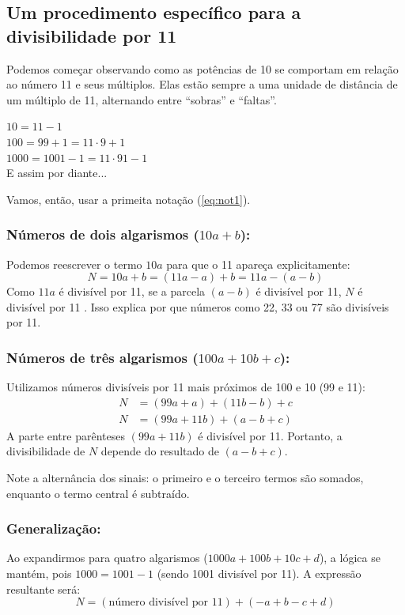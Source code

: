 \documentclass[12pt,a4paper]{article}
\begin{document}
		\newpage
		
		\subsection{Um procedimento específico para a divisibilidade por 11}
		\label{sub:div_11}
		
		Podemos começar observando como as potências de 10 se comportam em relação ao número 11 e seus múltiplos. Elas estão sempre a uma unidade de distância de um múltiplo de 11, alternando entre ``sobras'' e ``faltas''. 
		
		$10 = 11-1$\\
		$100 = 99 +1 = 11 \cdot 9 + 1$\\
		$1000 = 1001 - 1 = 11 \cdot 91 -1 $\\
		E assim por diante...
		
		Vamos, então, usar a primeita notação (\ref{eq:not1}).
		
		\subsubsection{Números de dois algarismos ($10a + b$):}
		Podemos reescrever o termo $10a$ para que o 11 apareça explicitamente:
		\[ N = 10a + b = (11a - a) + b = 11a - (a - b) \]
		Como $11a$ é divisível por 11, se a parcela $(a - b)$ é divisível por 11, $N$ é divisível por 11 . Isso explica por que números como 22, 33 ou 77 são divisíveis por 11.
		
		\subsubsection{Números de três algarismos ($100a + 10b + c$):}
		Utilizamos números divisíveis por 11 mais próximos de 100 e 10 (99 e 11):
		\begin{align*}
			N &= (99a + a) + (11b - b) + c \\
			N &= (99a + 11b) + (a - b + c)
		\end{align*}
		A parte entre parênteses $(99a + 11b)$ é divisível por 11. Portanto, a divisibilidade de $N$ depende do resultado de $(a - b + c)$. 
		
		Note a alternância dos sinais: o primeiro e o terceiro termos são somados, enquanto o termo central é subtraído.
		
		\subsubsection{Generalização:}
		Ao expandirmos para quatro algarismos ($1000a + 100b + 10c + d$), a lógica se mantém, pois $1000 = 1001 - 1$ (sendo 1001 divisível por 11). A expressão resultante será:
		\[ N = (\text{número divisível por 11}) + (-a + b - c + d) \]
		
\end{document}
